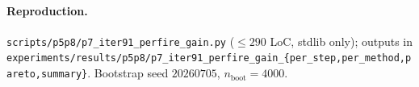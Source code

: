 \paragraph{Reproduction.}
\texttt{scripts/p5p8/p7\_iter91\_perfire\_gain.py}
($\le 290$ LoC, stdlib only); outputs in
\texttt{experiments/results/p5p8/p7\_iter91\_perfire\_gain\_\{per\_step,per\_method,pareto,summary\}}.
Bootstrap seed $20260705$, $n_{\mathrm{boot}}{=}4000$.

